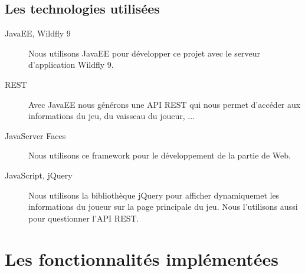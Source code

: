 \documentclass[a4paper,11pt]{report}
\begin{document}
    \subsection{Les technologies utilisées}
      \begin{description}
        \item[JavaEE, Wildfly 9] Nous utilisons JavaEE pour développer ce projet avec le serveur d'application Wildfly 9.
        \item[REST] Avec JavaEE nous générons une API REST qui nous permet d'accéder aux informations du jeu, du vaisseau du joueur, ...
        \item[JavaServer Faces] Nous utilisons ce framework pour le développement de la partie de Web.
        \item[JavaScript, jQuery] Nous utilisons la bibliothèque jQuery pour afficher dynamiquemet les informations du joueur sur la page principale du jeu. Nous l'utilisons aussi pour questionner l'API REST.
      \end{description}

  \section{Les fonctionnalités implémentées}
\end{document}
